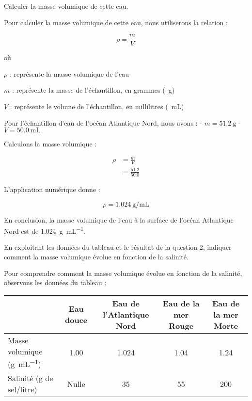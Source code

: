 \documentclass[answers]{exam}
\begin{document}
\begin{questions}
\question[4] Calculer la masse volumique de cette eau.
  
  

\begin{solution}
Pour calculer la masse volumique de cette eau, nous utiliserons la relation :

\[
\rho = \frac{m}{V}
\]

où 

\begin{addmargin}[4em]{1em}
\begin{compactitem}
    \item [$\rho$]: représente la masse volumique de l'eau
    \item [$m$]: représente la masse de l'échantillon, en grammes (\SI{}{\gram})
    \item [$V$]: représente le volume de l'échantillon, en millilitres (\SI{}{\milli\liter})
\end{compactitem}
\end{addmargin}

Pour l'échantillon d'eau de l'océan Atlantique Nord, nous avons :
- $m = \SI{51.2}{\gram}$
- $V = \SI{50.0}{\milli\liter}$

Calculons la masse volumique :

\begin{align*}
    \rho &= \frac{m}{V} \\
    &= \frac{51.2}{50.0} 
\end{align*}

L'application numérique donne :

\[
\rho = \SI{1.024}{\gram\per\milli\liter}
\]

En conclusion, la masse volumique de l'eau à la surface de l'océan Atlantique Nord est de \SI{1.024}{\gram\per\milli\liter}.
\end{solution}

\question[2] En exploitant les données du tableau et le résultat de la question 2, indiquer comment la masse volumique évolue en fonction de la salinité.
  
  

\begin{solution}
Pour comprendre comment la masse volumique évolue en fonction de la salinité, observons les données du tableau :

\begin{center}
\begin{tabular}{|l|c|c|c|c|}
\hline
& Eau douce & Eau de l'Atlantique Nord & Eau de la mer Rouge & Eau de la mer Morte \\
\hline
Masse volumique (\si{\gram\per\milli\liter}) & 1.00 & 1.024 & 1.04 & 1.24 \\
\hline
Salinité (g de sel/litre) & Nulle & 35 & 55 & 200 \\
\hline
\end{tabular}
\end{center}


\end{solution}
\end{questions}
\end{document}
